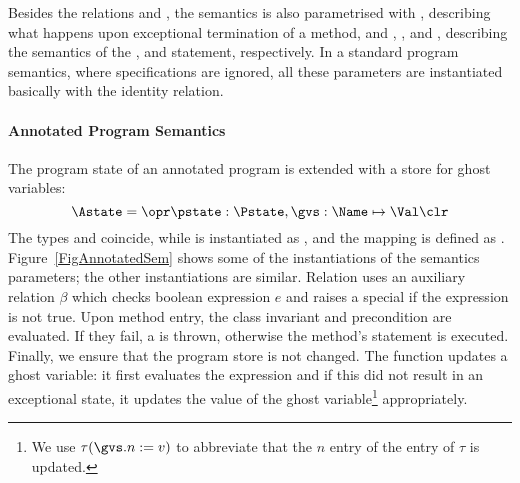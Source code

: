 Besides the relations \gammain and \gammanorm, the semantics
is also parametrised with
\gammaexc, describing what happens upon exceptional termination of a
method, and \deltaset, \deltacase, and \deltaassert, describing the
semantics of the \Set, \CaseJML and \Assert statement,
respectively. In a standard program semantics, where specifications
are ignored, all these parameters are instantiated basically with the
identity relation.



\paragraph{Annotated Program Semantics}


The program state of an annotated program is extended with a store for
ghost variables:
\[
\Astate = \opr \pstate : \Pstate, \gvs : \Name \mapsto \Val \clr
\]
The types \FullProgram and \Program coincide, while \FullState is
instantiated as \Astate, and the mapping \progstate is defined as
\pstate. Figure~\ref{FigAnnotatedSem} shows some of the
instantiations of the semantics parameters; the other instantiations
are similar. Relation \gammain uses an auxiliary relation \(\beta\)
which checks boolean expression \(e\) and raises a special \JMLExc if
the expression is not true. Upon method entry, the class invariant and
precondition are evaluated. If they fail, a \JMLExc is thrown,
otherwise the method's \preset statement is executed. Finally, we
ensure that the program store is not changed. The function
\deltaset updates a ghost variable: it first evaluates the expression
and if this did not result in an exceptional state, it updates the
value of the ghost variable\footnote{We use \(\tau(\gvs.n := v)\) to
abbreviate that the \(n\) entry of the \gvs entry of \(\tau\) is
updated.} appropriately.

